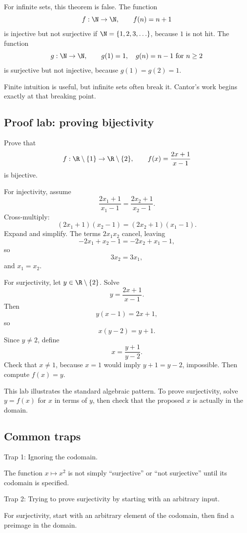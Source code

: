 For infinite sets, this theorem is false. The function
\[
f:\N\to\N,\qquad f(n)=n+1
\]
is injective but not surjective if $\N=\{1,2,3,\ldots\}$, because $1$ is not hit. The function
\[
g:\N\to\N,\qquad
g(1)=1,\quad g(n)=n-1\text{ for }n\geq2
\]
is surjective but not injective, because $g(1)=g(2)=1$.

\begin{focusbox}
Finite intuition is useful, but infinite sets often break it. Cantor's work begins exactly at that breaking point.
\end{focusbox}

\subsection{Proof lab: proving bijectivity}

\begin{labbox}
Prove that
\[
f:\R\setminus\{1\}\to\R\setminus\{2\},\qquad f(x)=\frac{2x+1}{x-1}
\]
is bijective.

For injectivity, assume
\[
\frac{2x_1+1}{x_1-1}=\frac{2x_2+1}{x_2-1}.
\]
Cross-multiply:
\[
(2x_1+1)(x_2-1)=(2x_2+1)(x_1-1).
\]
Expand and simplify. The terms $2x_1x_2$ cancel, leaving
\[
-2x_1+x_2-1=-2x_2+x_1-1,
\]
so
\[
3x_2=3x_1,
\]
and $x_1=x_2$.

For surjectivity, let $y\in\R\setminus\{2\}$. Solve
\[
y=\frac{2x+1}{x-1}.
\]
Then
\[
y(x-1)=2x+1,
\]
so
\[
x(y-2)=y+1.
\]
Since $y\neq2$, define
\[
x=\frac{y+1}{y-2}.
\]
Check that $x\neq1$, because $x=1$ would imply $y+1=y-2$, impossible. Then compute $f(x)=y$.
\end{labbox}

This lab illustrates the standard algebraic pattern. To prove surjectivity, solve $y=f(x)$ for $x$ in terms of $y$, then check that the proposed $x$ is actually in the domain.

\subsection{Common traps}

\begin{trapbox}
Trap 1: Ignoring the codomain.

The function $x\mapsto x^2$ is not simply ``surjective'' or ``not surjective'' until its codomain is specified.
\end{trapbox}

\begin{trapbox}
Trap 2: Trying to prove surjectivity by starting with an arbitrary input.

For surjectivity, start with an arbitrary element of the codomain, then find a preimage in the domain.
\end{trapbox}

